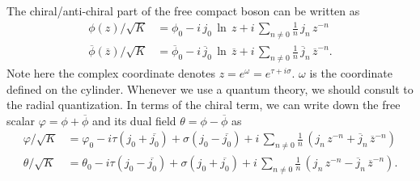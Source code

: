 The chiral/anti-chiral part of the free compact boson can be written as 
\begin{equation}
	\begin{split}
		\phi(z)/\sqrt{K} &= \phi_0 -i\,j_0\,\ln \,z + i\,\sum_{n\neq0} \frac{1}{n}\,j_n\,z^{-n} \\
		\overline{\phi}(\overline{z})/\sqrt{K} &= \overline{\phi}_0 -i\,\overline{j}_0\,\ln \, \overline{z} + i\,\sum_{n\neq0} \frac{1}{n}\,\overline{j}_n\,{\overline{z}}^{-n}.
	\end{split}
\end{equation} 
Note here the complex coordinate denotes $z = e^\omega = e^{\tau + i\sigma}$. $\omega$ is the coordinate defined on the cylinder. Whenever we use a quantum theory, we should consult to the radial quantization. In terms of the chiral term, we can write down the free scalar $\varphi = \phi + \overline{\phi}$ and its dual field $\theta = \phi - \overline{\phi}$ as
\begin{equation}
	\begin{split}
		\varphi/\sqrt{K} &= \varphi_0 -i \tau \left(j_0 + \overline{j_0}\right) + \sigma \left(j_0 - \overline{j_0}\right) + i\,\sum_{n\neq0} \frac{1}{n}\,\left( j_n\,z^{-n}+ \overline{j}_n\,{\overline{z}}^{-n}\right)\\
		\theta/\sqrt{K} &= \theta_0 -i \tau \left(j_0 - \overline{j_0}\right) + \sigma \left(j_0 + \overline{j_0}\right) + i\,\sum_{n\neq0} \frac{1}{n}\,\left( j_n\,z^{-n}- \overline{j}_n\,{\overline{z}}^{-n}\right).
	\end{split}
\end{equation}

